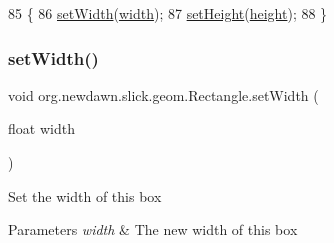 \begin{DoxyCode}
85                                                    \{
86         \mbox{\hyperlink{classorg_1_1newdawn_1_1slick_1_1geom_1_1_rectangle_a07dc8f2787f4c6d5dfc03fdda3e7d961}{setWidth}}(\mbox{\hyperlink{classorg_1_1newdawn_1_1slick_1_1geom_1_1_rectangle_a967e1823f62daf45abb142779d1be62d}{width}});
87         \mbox{\hyperlink{classorg_1_1newdawn_1_1slick_1_1geom_1_1_rectangle_a0f92d7c72369d28e09ae194b04119e26}{setHeight}}(\mbox{\hyperlink{classorg_1_1newdawn_1_1slick_1_1geom_1_1_rectangle_a3bd010fdce636fc11ed0e0ad4d4b4a0a}{height}});
88     \}
\end{DoxyCode}
\mbox{\label{classorg_1_1newdawn_1_1slick_1_1geom_1_1_rectangle_a07dc8f2787f4c6d5dfc03fdda3e7d961}} 
\subsubsection{\texorpdfstring{set\+Width()}{setWidth()}}
{\footnotesize\ttfamily void org.\+newdawn.\+slick.\+geom.\+Rectangle.\+set\+Width (\begin{DoxyParamCaption}\item[{float}]{width }\end{DoxyParamCaption})\hspace{0.3cm}{\ttfamily [inline]}}

Set the width of this box


\begin{DoxyParams}{Parameters}
{\em width} & The new width of this box \\
\hline
\end{DoxyParams}

